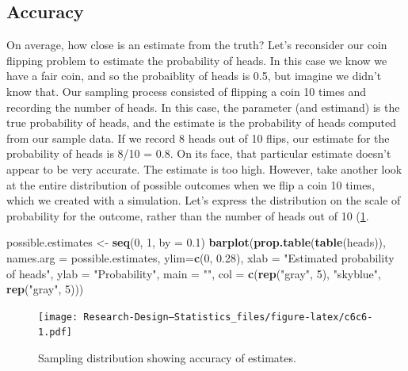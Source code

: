 \documentclass[
]{book}
\newenvironment{Shaded}{\begin{snugshade}}{\end{snugshade}}
\newcommand{\AttributeTok}[1]{\textcolor[rgb]{0.13,0.29,0.53}{#1}}
\newcommand{\DecValTok}[1]{\textcolor[rgb]{0.00,0.00,0.81}{#1}}
\newcommand{\FloatTok}[1]{\textcolor[rgb]{0.00,0.00,0.81}{#1}}
\newcommand{\FunctionTok}[1]{\textcolor[rgb]{0.13,0.29,0.53}{\textbf{#1}}}
\newcommand{\NormalTok}[1]{#1}
\newcommand{\OtherTok}[1]{\textcolor[rgb]{0.56,0.35,0.01}{#1}}
\newcommand{\StringTok}[1]{\textcolor[rgb]{0.31,0.60,0.02}{#1}}
\begin{document}
\subsection{Accuracy}\label{accuracy}

On average, how close is an estimate from the truth? Let's reconsider our coin flipping problem to estimate the probability of heads. In this case we know we have a fair coin, and so the probaiblity of heads is 0.5, but imagine we didn't know that. Our sampling process consisted of flipping a coin 10 times and recording the number of heads. In this case, the parameter (and estimand) is the true probability of heads, and the estimate is the probability of heads computed from our sample data. If we record 8 heads out of 10 flips, our estimate for the probability of heads is 8/10 = 0.8. On its face, that particular estimate doesn't appear to be very accurate. The estimate is too high. However, take another look at the entire distribution of possible outcomes when we flip a coin 10 times, which we created with a simulation. Let's express the distribution on the scale of probability for the outcome, rather than the number of heads out of 10 (\ref{fig:c6c6}.

\begin{Shaded}
\begin{Highlighting}[]
\NormalTok{possible.estimates }\OtherTok{\textless{}{-}} \FunctionTok{seq}\NormalTok{(}\DecValTok{0}\NormalTok{, }\DecValTok{1}\NormalTok{, }\AttributeTok{by =} \FloatTok{0.1}\NormalTok{)}
\FunctionTok{barplot}\NormalTok{(}\FunctionTok{prop.table}\NormalTok{(}\FunctionTok{table}\NormalTok{(heads)),}
        \AttributeTok{names.arg =}\NormalTok{ possible.estimates,}
        \AttributeTok{ylim=}\FunctionTok{c}\NormalTok{(}\DecValTok{0}\NormalTok{, }\FloatTok{0.28}\NormalTok{),}
        \AttributeTok{xlab =} \StringTok{"Estimated probability of heads"}\NormalTok{, }\AttributeTok{ylab =} \StringTok{"Probability"}\NormalTok{,}
        \AttributeTok{main =} \StringTok{""}\NormalTok{,}
        \AttributeTok{col =} \FunctionTok{c}\NormalTok{(}\FunctionTok{rep}\NormalTok{(}\StringTok{"gray"}\NormalTok{, }\DecValTok{5}\NormalTok{), }\StringTok{"skyblue"}\NormalTok{, }\FunctionTok{rep}\NormalTok{(}\StringTok{"gray"}\NormalTok{, }\DecValTok{5}\NormalTok{)))}
\end{Highlighting}
\end{Shaded}

\begin{figure}
\centering
\texttt{[image: Research-Design---Statistics\_files/figure-latex/c6c6-1.pdf]}
\caption{\label{fig:c6c6}Sampling distribution showing accuracy of estimates.}
\end{figure}
\end{document}

